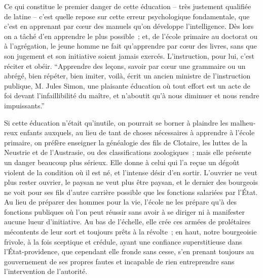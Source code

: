 \documentclass[french,twoside]{book} %
\begin{document}
Ce qui constitue le premier danger de cette éducation – très justement qualifiée de latine – c’est quelle repose sur cette erreur psychologique fondamentale, que c’est en apprenant par cœur des manuels qu’on développe l’intelligence. Dès lors on a tâché d’en apprendre le plus possible ; et, de l’école primaire au doctorat ou à l’agrégation, le jeune homme ne fait qu’apprendre par cœur des livres, sans que son jugement et son initiative soient jamais exercés. L’instruction, pour lui, c’est réciter et obéir. “Apprendre des leçons, savoir par cœur une grammaire ou un abrégé, bien répéter, bien imiter, voilà, écrit un ancien ministre de l’instruction publique, M. Jules Simon, une plaisante éducation où tout effort est un acte de foi devant l’infaillibilité du maître, et n’aboutit qu’à nous diminuer et nous rendre impuissants.”\par
Si cette éducation n’était qu’inutile, on pourrait se borner à plaindre les malheu­reux enfants auxquels, au lieu de tant de choses nécessaires à apprendre à l’école primaire, on préfère enseigner la généalogie des fils de Clotaire, les luttes de la Neustrie et de l’Austrasie, ou des classifications zoologiques ; mais elle présente un danger beaucoup plus sérieux. Elle donne à celui qui l’a reçue un dégoût violent de la condition où il est né, et l’intense désir d’en sortir. L’ouvrier ne veut plus rester ouvrier, le paysan ne veut plus être paysan, et le dernier des bourgeois ne voit pour ses fils d’autre carrière possible que les fonctions salariées par l’État. Au lieu de préparer des hommes pour la vie, l’école ne les prépare qu’à des fonctions publiques où l’on peut réussir sans avoir à se diriger ni à manifester aucune lueur d’initiative. Au bas de l’échelle, elle crée ces armées de prolétaires mécontents de leur sort et toujours prêts à la révolte ; en haut, notre bourgeoisie frivole, à la fois sceptique et crédule, ayant une confiance superstitieuse dans l’État-providence, que cependant elle fronde sans cesse, s’en prenant toujours au gouvernement de ses propres fautes et incapable de rien entreprendre sans l’intervention de l’autorité.\par
\end{document}
